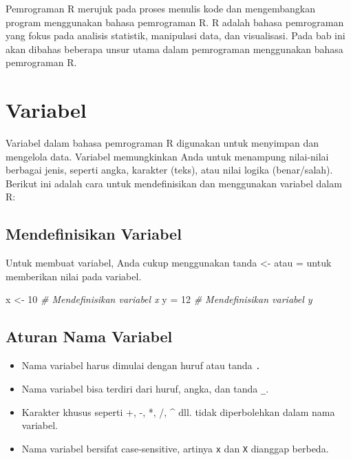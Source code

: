 \documentclass[
]{book}
\newenvironment{Shaded}{\begin{snugshade}}{\end{snugshade}}
\newcommand{\CommentTok}[1]{\textcolor[rgb]{0.56,0.35,0.01}{\textit{#1}}}
\newcommand{\DecValTok}[1]{\textcolor[rgb]{0.00,0.00,0.81}{#1}}
\newcommand{\NormalTok}[1]{#1}
\newcommand{\OtherTok}[1]{\textcolor[rgb]{0.56,0.35,0.01}{#1}}
\providecommand{\tightlist}{%
  \setlength{\itemsep}{0pt}\setlength{\parskip}{0pt}}
\begin{document}
Pemrograman R merujuk pada proses menulis kode dan mengembangkan program menggunakan bahasa pemrograman R. R adalah bahasa pemrograman yang fokus pada analisis statistik, manipulasi data, dan visualisasi. Pada bab ini akan dibahas beberapa unsur utama dalam pemrograman menggunakan bahasa pemrograman R.

\hypertarget{variabel}{%
\section{Variabel}\label{variabel}}

Variabel dalam bahasa pemrograman R digunakan untuk menyimpan dan mengelola data. Variabel memungkinkan Anda untuk menampung nilai-nilai berbagai jenis, seperti angka, karakter (teks), atau nilai logika (benar/salah). Berikut ini adalah cara untuk mendefinisikan dan menggunakan variabel dalam R:

\hypertarget{mendefinisikan-variabel}{%
\subsection{Mendefinisikan Variabel}\label{mendefinisikan-variabel}}

Untuk membuat variabel, Anda cukup menggunakan tanda \textless- atau = untuk memberikan nilai pada variabel.

\begin{Shaded}
\begin{Highlighting}[]
\NormalTok{x }\OtherTok{\textless{}{-}} \DecValTok{10}          \CommentTok{\# Mendefinisikan variabel x }
\NormalTok{y }\OtherTok{=} \DecValTok{12}           \CommentTok{\# Mendefinisikan variabel y}
\end{Highlighting}
\end{Shaded}

\hypertarget{aturan-nama-variabel}{%
\subsection{Aturan Nama Variabel}\label{aturan-nama-variabel}}

\begin{itemize}
\tightlist
\item
  Nama variabel harus dimulai dengan huruf atau tanda \texttt{.}
\item
  Nama variabel bisa terdiri dari huruf, angka, dan tanda \texttt{\_}.
\item
  Karakter khusus seperti +, -, *, /, \^{} dll. tidak diperbolehkan dalam nama variabel.
\item
  Nama variabel bersifat case-sensitive, artinya \texttt{x} dan \texttt{X} dianggap berbeda.
\end{itemize}
\end{document}
